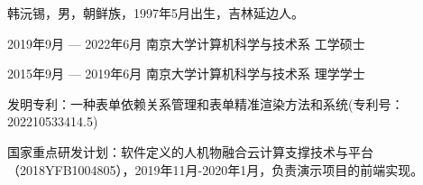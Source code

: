 \documentclass[winfonts,master,twoside]{njuthesis}
\begin{document}
\begin{resume}
    \begin{authorinfo}
        \noindent 韩沅锡，男，朝鲜族，1997年5月出生，吉林延边人。
    \end{authorinfo}
    \begin{education}
        \item[2019年9月 --- 2022年6月] 南京大学计算机科学与技术系 \hfill 工学硕士
        \item[2015年9月 --- 2019年6月] 南京大学计算机科学与技术系 \hfill 理学学士
    \end{education}

    \begin{publications}
        \item 发明专利：一种表单依赖关系管理和表单精准渲染方法和系统(专利号：202210533414.5)
    \end{publications}

    \begin{projects}
        \item 国家重点研发计划：软件定义的人机物融合云计算支撑技术与平台（2018YFB1004805），2019年11月-2020年1月，负责演示项目的前端实现。
    \end{projects}
\end{resume}

\makelicense

\end{document}
